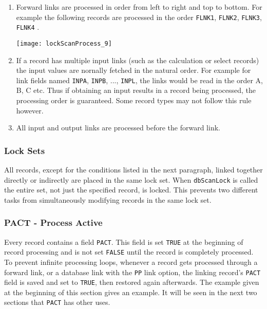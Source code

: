 \begin{enumerate}
\item Forward links are processed in order from left to right and top to bottom. For example the following records are 
processed in the order \verb|FLNK1|, \verb|FLNK2|, \verb|FLNK3|, \verb|FLNK4| .

\begin{center}
\texttt{[image: lockScanProcess\_9]}
\end{center}

\item If a record has multiple input links (such as the calculation or select records) the input values are nornally fetched in the natural order.
For example for link fields named \verb|INPA|, \verb|INPB|, ..., \verb|INPL|, the links would be read in the order A, B, C etc.
Thus if obtaining an input results in a record being processed, the processing order is guaranteed.
Some record types may not follow this rule however.

\item All input and output links are processed before the forward link.

\end{enumerate}

\subsubsection{Lock Sets}

All records, except for the conditions listed in the next paragraph, linked together directly or indirectly are placed in the 
same lock set.
When \verb|dbScanLock| is called the entire set, not just the specified record, is locked.
This prevents two different tasks from simultaneously modifying records in the same lock set.

\subsubsection{PACT - Process Active}

Every record contains a field \verb|PACT|.
This field is set \verb|TRUE| at the beginning of record processing and is not set \verb|FALSE| until the record is completely processed.
To prevent infinite processing loops, whenever a record gets processed through a forward link, or a database link with the \verb|PP| link option, the linking record's \verb|PACT| field is saved and set to \verb|TRUE|, then restored again afterwards.
The example given at the beginning of this section gives an example.
It will be seen in the next two sections that \verb|PACT| has other uses.

